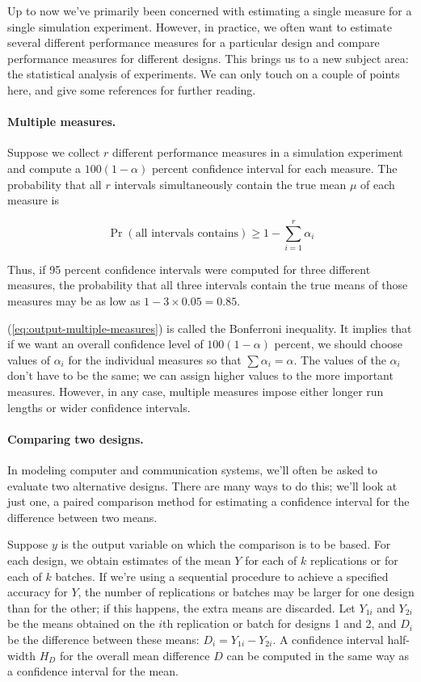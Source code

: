 Up to now we've primarily been concerned with estimating a single measure for
a single simulation experiment. However, in practice, we often want to
estimate several different performance measures for a particular design and
compare performance measures for different designs. This brings us to a new
subject area: the statistical analysis of experiments. We can only touch on a
couple of points here, and give some references for further reading.

\paragraph{Multiple measures.}
Suppose we collect $r$ different performance measures in a simulation
experiment and compute a $100(1-\alpha)$ percent confidence interval for each
measure. The probability that all $r$ intervals simultaneously contain the
true mean $\mu$ of each measure is

\begin{equation}
\Pr(\text{all intervals contains}) \ge 1 - \sum_{i=1}^{r} \alpha_i
\label{eq:output-multiple-measures}
\end{equation}

Thus, if 95 percent confidence intervals were computed for three different
measures, the probability that all three intervals contain the true means of
those measures may be as low as $1 - 3 \times 0.05 = 0.85$.

\noindent (\ref{eq:output-multiple-measures}) is called the Bonferroni inequality. It
implies that if we want an overall confidence level of $100(1-\alpha)$ percent,
we should choose values of $\alpha_i$ for the individual measures so that
$\sum \alpha_i = \alpha$. The values of the $\alpha_i$ don't have to be the same;
we can assign higher values to the more important measures. However, in any
case, multiple measures impose either longer run lengths or wider confidence
intervals.

\paragraph{Comparing two designs.}
In modeling computer and communication systems, we'll often be asked to
evaluate two alternative designs. There are many ways to do this; we'll look at
just one, a paired comparison method for estimating a confidence interval for
the difference between two means.

Suppose $y$ is the output variable on which the comparison is to be based. For
each design, we obtain estimates of the mean $Y$ for each of $k$ replications or
for each of $k$ batches. If we're using a sequential procedure to achieve a
specified accuracy for $Y$, the number of replications or batches may be larger
for one design than for the other; if this happens, the extra means are
discarded. Let $Y_{1i}$ and $Y_{2i}$ be the means obtained on the $i$th
replication or batch for designs 1 and 2, and $D_i$ be the difference between
these means: $D_i = Y_{1i} - Y_{2i}$. A confidence interval half-width $H_D$ for
the overall mean difference $D$ can be computed in the same way as a
confidence interval for the mean.


